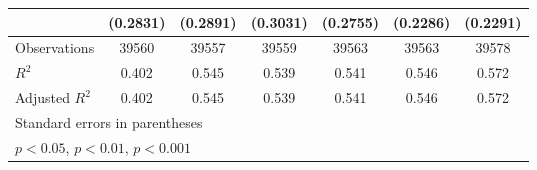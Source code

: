 {\begin{tabular}{l*{6}{c}}
                    &    (0.2831)         &    (0.2891)         &    (0.3031)         &    (0.2755)         &    (0.2286)         &    (0.2291)         \\
\midrule
Observations        &       39560         &       39557         &       39559         &       39563         &       39563         &       39578         \\
\(R^{2}\)           &       0.402         &       0.545         &       0.539         &       0.541         &       0.546         &       0.572         \\
Adjusted \(R^{2}\)  &       0.402         &       0.545         &       0.539         &       0.541         &       0.546         &       0.572         \\
\bottomrule
\multicolumn{7}{l}{\footnotesize Standard errors in parentheses}\\
\multicolumn{7}{l}{\footnotesize \sym{*} \(p<0.05\), \sym{**} \(p<0.01\), \sym{***} \(p<0.001\)}\\
\end{tabular}
}
